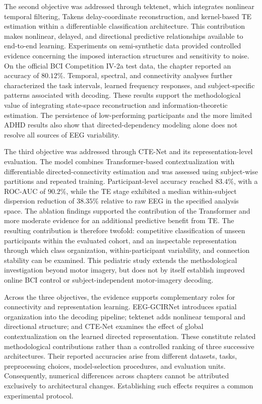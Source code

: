 The second objective was addressed through \gls{tektenet}, which integrates nonlinear temporal filtering, Takens delay-coordinate reconstruction, and kernel-based TE estimation within a differentiable classification architecture. This contribution makes nonlinear, delayed, and directional predictive relationships available to end-to-end learning. Experiments on semi-synthetic data provided controlled evidence concerning the imposed interaction structures and sensitivity to noise. On the official BCI Competition IV-2a test data, the chapter reported an accuracy of $80.12\%$. Temporal, spectral, and connectivity analyses further characterized the task intervals, learned frequency responses, and subject-specific patterns associated with decoding. These results support the methodological value of integrating state-space reconstruction and information-theoretic estimation. The persistence of low-performing participants and the more limited ADHD results also show that directed-dependency modeling alone does not resolve all sources of EEG variability.

The third objective was addressed through CTE-Net and its representation-level evaluation. The model combines Transformer-based contextualization with differentiable directed-connectivity estimation and was assessed using subject-wise partitions and repeated training. Participant-level accuracy reached $83.4\%$, with a ROC-AUC of $90.2\%$, while the TE stage exhibited a median within-subject dispersion reduction of $38.35\%$ relative to raw EEG in the specified analysis space. The ablation findings supported the contribution of the Transformer and more moderate evidence for an additional predictive benefit from TE. The resulting contribution is therefore twofold: competitive classification of unseen participants within the evaluated cohort, and an inspectable representation through which class organization, within-participant variability, and connection stability can be examined. This pediatric study extends the methodological investigation beyond motor imagery, but does not by itself establish improved online BCI control or subject-independent motor-imagery decoding.

Across the three objectives, the evidence supports complementary roles for connectivity and representation learning. EEG-GCIRNet introduces spatial organization into the decoding pipeline; \gls{tektenet} adds nonlinear temporal and directional structure; and CTE-Net examines the effect of global contextualization on the learned directed representation. These constitute related methodological contributions rather than a controlled ranking of three successive architectures. Their reported accuracies arise from different datasets, tasks, preprocessing choices, model-selection procedures, and evaluation units. Consequently, numerical differences across chapters cannot be attributed exclusively to architectural changes. Establishing such effects requires a common experimental protocol.

